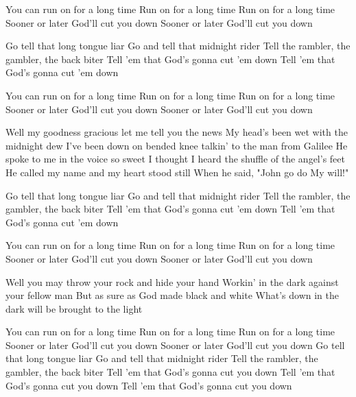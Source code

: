 

You can run on for a long time
Run on for a long time
Run on for a long time
Sooner or later God'll cut you down
Sooner or later God'll cut you down

Go tell that long tongue liar
Go and tell that midnight rider
Tell the rambler, the gambler, the back biter
Tell 'em that God's gonna cut 'em down
Tell 'em that God's gonna cut 'em down

You can run on for a long time
Run on for a long time
Run on for a long time
Sooner or later God'll cut you down
Sooner or later God'll cut you down


Well my goodness gracious let me tell you the news
My head's been wet with the midnight dew
I've been down on bended knee talkin' to the man from Galilee
He spoke to me in the voice so sweet
I thought I heard the shuffle of the angel's feet
He called my name and my heart stood still
When he said, "John go do My will!"








Go tell that long tongue liar
Go and tell that midnight rider
Tell the rambler, the gambler, the back biter
Tell 'em that God's gonna cut 'em down
Tell 'em that God's gonna cut 'em down

You can run on for a long time
Run on for a long time
Run on for a long time
Sooner or later God'll cut you down
Sooner or later God'll cut you down

Well you may throw your rock and hide your hand
Workin' in the dark against your fellow man
But as sure as God made black and white
What's down in the dark will be brought to the light

You can run on for a long time
Run on for a long time
Run on for a long time
Sooner or later God'll cut you down
Sooner or later God'll cut you down
Go tell that long tongue liar
Go and tell that midnight rider
Tell the rambler, the gambler, the back biter
Tell 'em that God's gonna cut you down
Tell 'em that God's gonna cut you down
Tell 'em that God's gonna cut you down



